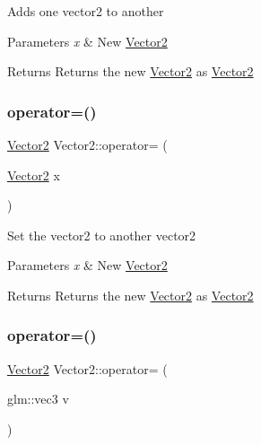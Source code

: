 Adds one vector2 to another 
\begin{DoxyParams}{Parameters}
{\em x} & New \mbox{\hyperlink{struct_vector2}{Vector2}} \\
\hline
\end{DoxyParams}
\begin{DoxyReturn}{Returns}
Returns the new \mbox{\hyperlink{struct_vector2}{Vector2}} as \mbox{\hyperlink{struct_vector2}{Vector2}} 
\end{DoxyReturn}
\mbox{\label{struct_vector2_a7e9bf2ca75c051fe51cbc8a484923d6d}} 
\subsubsection{\texorpdfstring{operator=()}{operator=()}\hspace{0.1cm}{\footnotesize\ttfamily [1/2]}}
{\footnotesize\ttfamily \mbox{\hyperlink{struct_vector2}{Vector2}} Vector2\+::operator= (\begin{DoxyParamCaption}\item[{\mbox{\hyperlink{struct_vector2}{Vector2}}}]{x }\end{DoxyParamCaption})\hspace{0.3cm}{\ttfamily [inline]}}

Set the vector2 to another vector2 
\begin{DoxyParams}{Parameters}
{\em x} & New \mbox{\hyperlink{struct_vector2}{Vector2}} \\
\hline
\end{DoxyParams}
\begin{DoxyReturn}{Returns}
Returns the new \mbox{\hyperlink{struct_vector2}{Vector2}} as \mbox{\hyperlink{struct_vector2}{Vector2}} 
\end{DoxyReturn}
\mbox{\label{struct_vector2_a6baf5cab131f85f846b784ad31c506ec}} 
\subsubsection{\texorpdfstring{operator=()}{operator=()}\hspace{0.1cm}{\footnotesize\ttfamily [2/2]}}
{\footnotesize\ttfamily \mbox{\hyperlink{struct_vector2}{Vector2}} Vector2\+::operator= (\begin{DoxyParamCaption}\item[{glm\+::vec3}]{v }\end{DoxyParamCaption})\hspace{0.3cm}{\ttfamily [inline]}}

